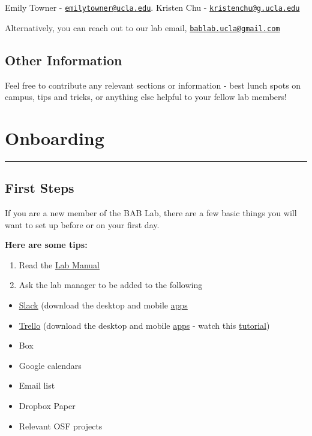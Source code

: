 \documentclass[]{book}
\providecommand{\tightlist}{%
  \setlength{\itemsep}{0pt}\setlength{\parskip}{0pt}}
\begin{document}
Emily Towner - \href{mailto:emilytowner@ucla.edu}{\nolinkurl{emilytowner@ucla.edu}}.
Kristen Chu - \href{mailto:kristenchu@g.ucla.edu}{\nolinkurl{kristenchu@g.ucla.edu}}

Alternatively, you can reach out to our lab email, \href{mailto:bablab.ucla@gmail.com}{\nolinkurl{bablab.ucla@gmail.com}}

\hypertarget{other-information}{%
\section{Other Information}\label{other-information}}

Feel free to contribute any relevant sections or information - best lunch spots on campus, tips and tricks, or anything else helpful to your fellow lab members!

\hypertarget{onboarding}{%
\chapter{Onboarding}\label{onboarding}}

\begin{center}\rule{0.5\linewidth}{\linethickness}\end{center}

\hypertarget{first-steps}{%
\section{First Steps}\label{first-steps}}

If you are a new member of the BAB Lab, there are a few basic things you will want to set up before or on your first day.

\textbf{Here are some tips:}

\begin{enumerate}
\def\labelenumi{\arabic{enumi}.}
\item
  Read the \href{https://bab-lab.github.io/lab_manual/}{Lab Manual}
\item
  Ask the lab manager to be added to the following
\end{enumerate}

\begin{itemize}
\tightlist
\item
  \href{https://slack.com/}{Slack} (download the desktop and mobile \href{https://slack.com/downloads/mac}{apps}
\item
  \href{https://trello.com/emilyanntowner/boards}{Trello} (download the desktop and mobile \href{https://trello.com/en-US/platforms}{apps} - watch this \href{https://www.youtube.com/watch?v=_Ry-SnJygy8\&feature=youtu.be}{tutorial})
\item
  Box
\item
  Google calendars
\item
  Email list
\item
  Dropbox Paper
\item
  Relevant OSF projects
\end{itemize}
\end{document}
